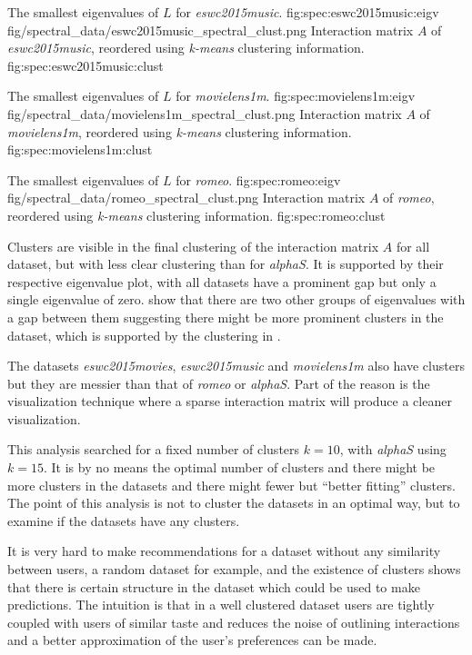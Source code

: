 {The smallest eigenvalues of $L$ for \textit{eswc2015music}.}
{fig:spec:eswc2015music:eigv}
{fig/spectral_data/eswc2015music_spectral_clust.png}
{Interaction matrix $A$ of \textit{eswc2015music}, reordered using \textit{k-means} clustering information.}
{fig:spec:eswc2015music:clust}

{The smallest eigenvalues of $L$ for \textit{movielens1m}.}
{fig:spec:movielens1m:eigv}
{fig/spectral_data/movielens1m_spectral_clust.png}
{Interaction matrix $A$ of \textit{movielens1m}, reordered using \textit{k-means} clustering information.}
{fig:spec:movielens1m:clust}

\FloatBarrier

{The smallest eigenvalues of $L$ for \textit{romeo}.}
{fig:spec:romeo:eigv}
{fig/spectral_data/romeo_spectral_clust.png}
{Interaction matrix $A$ of \textit{romeo}, reordered using \textit{k-means} clustering information.}
{fig:spec:romeo:clust}


\newpage

Clusters are visible in the final clustering of the interaction matrix $A$ for all dataset, but with less clear clustering than for \textit{alphaS}. It is supported by their respective eigenvalue plot, with all datasets have a prominent gap but only a single eigenvalue of zero.  show that there are two other groups of eigenvalues with a gap between them suggesting there might be more prominent clusters in the dataset, which is supported by the clustering in .

The datasets \textit{eswc2015movies}, \textit{eswc2015music} and \textit{movielens1m} also have clusters but they are messier than that of \textit{romeo} or \textit{alphaS}. Part of the reason is the visualization technique where a sparse interaction matrix will produce a cleaner visualization.

This analysis searched for a fixed number of clusters $k = 10$, with \textit{alphaS} using $k = 15$. It is by no means the optimal number of clusters and there might be more clusters in the datasets and there might fewer but ``better fitting'' clusters. The point of this analysis is not to cluster the datasets in an optimal way, but to examine if the datasets have any clusters.

It is very hard to make recommendations for a dataset without any similarity between users, a random dataset for example, and the existence of clusters shows that there is certain structure in the dataset which could be used to make predictions. The intuition is that in a well clustered dataset users are tightly coupled with users of similar taste and reduces the noise of outlining interactions and a better approximation of the user's preferences can be made.

